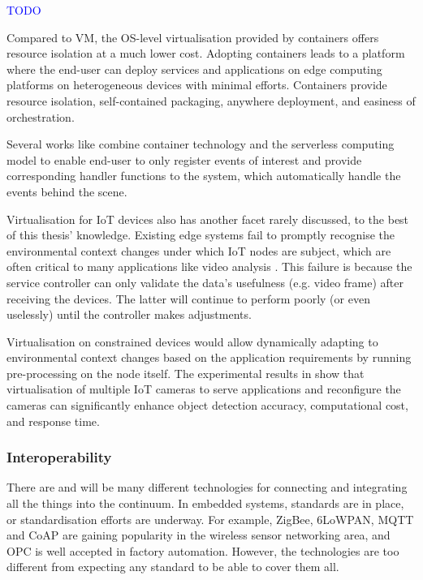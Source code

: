 \documentclass{ieeeaccess}
\begin{document}
\textcolor{blue}{TODO}

Compared to VM, the OS-level virtualisation provided by containers offers resource isolation at a much lower cost. Adopting containers leads to a platform where the end-user can deploy services and applications on edge computing platforms on heterogeneous devices with minimal efforts. Containers provide resource isolation, self-contained packaging, anywhere deployment, and easiness of orchestration.

Several works like \cite{lavea} combine container technology and the serverless computing model to enable end-user to only register events of interest and provide corresponding handler functions to the system, which automatically handle the events behind the scene.

Virtualisation for IoT devices also has another facet rarely discussed, to the best of this thesis' knowledge. Existing edge systems fail to promptly recognise the environmental context changes under which IoT nodes are subject, which are often critical to many applications like video analysis \cite{camera-virtualisation}. This failure is because the service controller can only validate the data's usefulness (e.g. video frame) after receiving the devices. The latter will continue to perform poorly (or even uselessly) until the controller makes adjustments.

Virtualisation on constrained devices would allow dynamically adapting to environmental context changes based on the application requirements by running pre-processing on the node itself. The experimental results in \cite{camera-virtualisation} show that virtualisation of multiple IoT cameras to serve applications and reconfigure the cameras can significantly enhance object detection accuracy, computational cost, and response time.

\subsubsection{Interoperability}

There are and will be many different technologies for connecting and integrating all the things into the continuum. In embedded systems, standards are in place, or standardisation efforts are underway. For example, ZigBee, 6LoWPAN, MQTT and CoAP \cite{mqtt-coap-amqp-http} are gaining popularity in the wireless sensor networking area, and OPC \cite{rest-opc} is well accepted in factory automation. However, the technologies are too different from expecting any standard to be able to cover them all.
\end{document}

